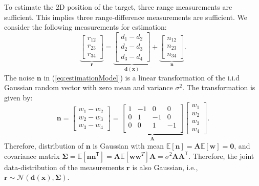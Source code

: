 \documentclass[11pt]{article}
\newcommand{\br}{\mathbf{r}}
\newcommand{\bd}{\mathbf{d}}
\newcommand{\bn}{\mathbf{n}}
\newcommand{\bx}{\mathbf{x}}
\newcommand{\bw}{\mathbf{w}}
\newcommand{\bA}{\mathbf{A}}
\newcommand{\Ex}{\mathbb{E}}
\newcommand{\TT}{\mathsf{T}}
\newcommand{\zerovec}{\boldsymbol{0}}
\newcommand{\bSigma}{\boldsymbol{\Sigma}}
\begin{document}
To estimate the 2D position of the target, three range measurements are sufficient. This implies three range-difference measurements are sufficient. We consider the following measurements for estimation:
\begin{equation}
	\underbrace{\begin{bmatrix}
		r_{12} \\ r_{23} \\ r_{34}
	\end{bmatrix}}_{\br} = 
	\underbrace{\begin{bmatrix}
		d_{1}-d_{2} \\ d_{2}-d_{3} \\ d_{3}-d_{4}
	\end{bmatrix}}_{\bd(\bx)} +
	\underbrace{\begin{bmatrix}
		n_{12} \\ n_{23} \\ n_{34}
	\end{bmatrix}}_{\bn}.
\label{eq:estimationModel}
\end{equation}
The noise $\bn$ in (\ref{eq:estimationModel}) is a linear transformation of the i.i.d Gaussian random vector with zero mean and variance $\sigma^{2}$. The transformation is given by:
\begin{equation}
	\bn = \begin{bmatrix}
		w_{1} - w_{2} \\ w_{2} - w_{3} \\ w_{3} - w_{4}
	\end{bmatrix} = 
	\underbrace{\begin{bmatrix}
		1 & -1 & 0 & 0 \\
		0 & 1 & -1 & 0 \\
		0 & 0 & 1 & -1 \\
	\end{bmatrix}}_{\bA}
	\begin{bmatrix}
		w_{1} \\ w_{2} \\ w_{3} \\ w_{4}
	\end{bmatrix}.
\label{eq:noiseModel}
\end{equation}
Therefore, distribution of $\bn$ is Gaussian with mean $\Ex \left[ \bn \right] = \bA \Ex \left[ \bw \right] = \zerovec$, and covariance matrix $\bSigma = \Ex \left[ \bn \bn^{\TT} \right] = \bA \Ex \left[ \bw \bw^{T} \right] \bA = \sigma^{2} \bA \bA^{\TT}$. Therefore, the joint data-distribution of the measurements $\br$ is also Gaussian, i.e., $\br \sim \mathcal{N} \left( \bd(\bx), \bSigma \right)$.
\end{document}
